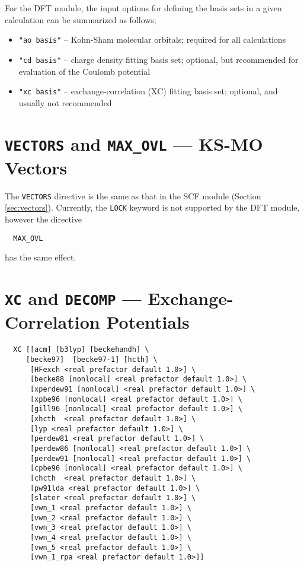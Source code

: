 For the DFT module, the input options for defining the basis sets in a given
calculation can be summarized as follows;
\begin{itemize}
\item {\tt "ao basis"} -- Kohn-Sham molecular orbitals; required for all 
calculations
\item {\tt "cd basis"} -- charge density fitting basis set; optional, but
recommended for evaluation of the Coulomb potential
\item {\tt "xc basis"} -- exchange-correlation (XC) fitting basis set; 
optional, and usually not recommended
\end{itemize}


\section{{\tt VECTORS} and {\tt MAX\_OVL} --- KS-MO Vectors}

The \verb+VECTORS+ directive is the same as that in the SCF module
(Section \ref{sec:vectors}).  Currently, the \verb+LOCK+ keyword
is not supported by the DFT module, however the directive
\begin{verbatim}
  MAX_OVL
\end{verbatim}
has the same effect.

\section{{\tt XC} and {\tt DECOMP} --- Exchange-Correlation Potentials}
\begin{verbatim}
  XC [[acm] [b3lyp] [beckehandh] \
     [becke97]  [becke97-1] [hcth] \
      [HFexch <real prefactor default 1.0>] \
      [becke88 [nonlocal] <real prefactor default 1.0>] \
      [xperdew91 [nonlocal] <real prefactor default 1.0>] \
      [xpbe96 [nonlocal] <real prefactor default 1.0>] \
      [gill96 [nonlocal] <real prefactor default 1.0>] \
      [xhcth  <real prefactor default 1.0>] \
      [lyp <real prefactor default 1.0>] \
      [perdew81 <real prefactor default 1.0>] \
      [perdew86 [nonlocal] <real prefactor default 1.0>] \
      [perdew91 [nonlocal] <real prefactor default 1.0>] \
      [cpbe96 [nonlocal] <real prefactor default 1.0>] \
      [chcth  <real prefactor default 1.0>] \
      [pw91lda <real prefactor default 1.0>] \
      [slater <real prefactor default 1.0>] \
      [vwn_1 <real prefactor default 1.0>] \
      [vwn_2 <real prefactor default 1.0>] \
      [vwn_3 <real prefactor default 1.0>] \
      [vwn_4 <real prefactor default 1.0>] \
      [vwn_5 <real prefactor default 1.0>] \
      [vwn_1_rpa <real prefactor default 1.0>]]
\end{verbatim}

